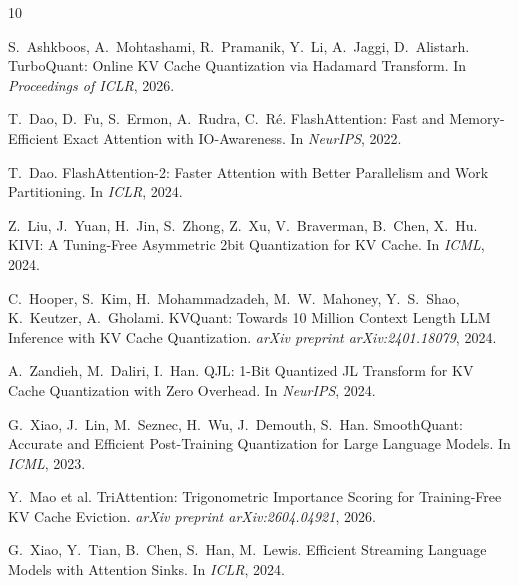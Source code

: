 \documentclass[10pt,twocolumn]{article}
\begin{document}

\begin{thebibliography}{10}

S.~Ashkboos, A.~Mohtashami, R.~Pramanik, Y.~Li, A.~Jaggi, D.~Alistarh.
\newblock TurboQuant: Online KV Cache Quantization via Hadamard Transform.
\newblock In \emph{Proceedings of ICLR}, 2026.

T.~Dao, D.~Fu, S.~Ermon, A.~Rudra, C.~R\'{e}.
\newblock FlashAttention: Fast and Memory-Efficient Exact Attention with IO-Awareness.
\newblock In \emph{NeurIPS}, 2022.

T.~Dao.
\newblock FlashAttention-2: Faster Attention with Better Parallelism and Work Partitioning.
\newblock In \emph{ICLR}, 2024.

Z.~Liu, J.~Yuan, H.~Jin, S.~Zhong, Z.~Xu, V.~Braverman, B.~Chen, X.~Hu.
\newblock KIVI: A Tuning-Free Asymmetric 2bit Quantization for KV Cache.
\newblock In \emph{ICML}, 2024.

C.~Hooper, S.~Kim, H.~Mohammadzadeh, M.~W.~Mahoney, Y.~S.~Shao, K.~Keutzer, A.~Gholami.
\newblock KVQuant: Towards 10 Million Context Length LLM Inference with KV Cache Quantization.
\newblock \emph{arXiv preprint arXiv:2401.18079}, 2024.

A.~Zandieh, M.~Daliri, I.~Han.
\newblock QJL: 1-Bit Quantized JL Transform for KV Cache Quantization with Zero Overhead.
\newblock In \emph{NeurIPS}, 2024.

G.~Xiao, J.~Lin, M.~Seznec, H.~Wu, J.~Demouth, S.~Han.
\newblock SmoothQuant: Accurate and Efficient Post-Training Quantization for Large Language Models.
\newblock In \emph{ICML}, 2023.

Y.~Mao et al.
\newblock TriAttention: Trigonometric Importance Scoring for Training-Free KV Cache Eviction.
\newblock \emph{arXiv preprint arXiv:2604.04921}, 2026.

G.~Xiao, Y.~Tian, B.~Chen, S.~Han, M.~Lewis.
\newblock Efficient Streaming Language Models with Attention Sinks.
\newblock In \emph{ICLR}, 2024.

\end{thebibliography}
\end{document}
